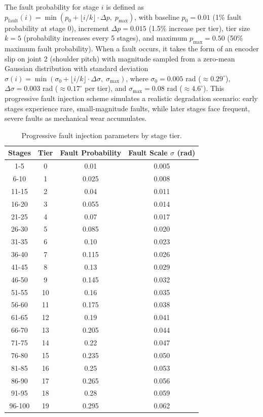 \documentclass[12pt,a4paper,oneside]{report}
\begin{document}
The fault probability for stage $i$ is defined as $p_{\text{fault}}(i) = \min(p_0 + \lfloor i/k \rfloor \cdot \Delta p,\; p_{\text{max}})$, with baseline $p_0 = 0.01$ (1\% fault probability at stage 0), increment $\Delta p = 0.015$ (1.5\% increase per tier), tier size $k = 5$ (probability increases every 5 stages), and maximum $p_{\text{max}} = 0.50$ (50\% maximum fault probability). When a fault occurs, it takes the form of an encoder slip on joint 2 (shoulder pitch) with magnitude sampled from a zero-mean Gaussian distribution with standard deviation $\sigma(i) = \min(\sigma_0 + \lfloor i/k \rfloor \cdot \Delta \sigma,\; \sigma_{\text{max}})$, where $\sigma_0 = 0.005$ rad ($\approx 0.29^\circ$), $\Delta \sigma = 0.003$ rad ($\approx 0.17^\circ$ per tier), and $\sigma_{\text{max}} = 0.08$ rad ($\approx 4.6^\circ$). This progressive fault injection scheme simulates a realistic degradation scenario: early stages experience rare, small-magnitude faults, while later stages face frequent, severe faults as mechanical wear accumulates.

\begin{table}[H]
\centering
\caption{Progressive fault injection parameters by stage tier.}
\label{tab:fault_tiers}
\begin{tabular}{cccc}
\toprule
\textbf{Stages} & \textbf{Tier} & \textbf{Fault Probability} & \textbf{Fault Scale $\sigma$ (rad)} \\
\midrule
1-5 & 0 & 0.01 & 0.005 \\
6-10 & 1 & 0.025 & 0.008 \\
11-15 & 2 & 0.04 & 0.011 \\
16-20 & 3 & 0.055 & 0.014 \\
21-25 & 4 & 0.07 & 0.017 \\
26-30 & 5 & 0.085 & 0.020 \\
31-35 & 6 & 0.10 & 0.023 \\
36-40 & 7 & 0.115 & 0.026 \\
41-45 & 8 & 0.13 & 0.029 \\
46-50 & 9 & 0.145 & 0.032 \\
51-55 & 10 & 0.16 & 0.035 \\
56-60 & 11 & 0.175 & 0.038 \\
61-65 & 12 & 0.19 & 0.041 \\
66-70 & 13 & 0.205 & 0.044 \\
71-75 & 14 & 0.22 & 0.047 \\
76-80 & 15 & 0.235 & 0.050 \\
81-85 & 16 & 0.25 & 0.053 \\
86-90 & 17 & 0.265 & 0.056 \\
91-95 & 18 & 0.28 & 0.059 \\
96-100 & 19 & 0.295 & 0.062 \\
\bottomrule
\end{tabular}
\end{table}
\end{document}

